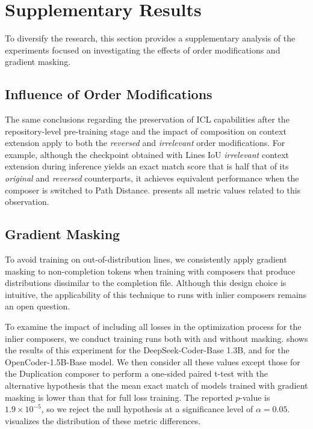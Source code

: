 \section{Supplementary Results}

To diversify the research, this section provides a supplementary analysis of the experiments focused on investigating the effects of order modifications and gradient masking.

\subsection{Influence of Order Modifications}

The same conclusions regarding the preservation of ICL capabilities after the repository-level pre-training stage and the impact of composition on context extension apply to both the \textit{reversed} and \textit{irrelevant} order modifications. For example, although the checkpoint obtained with Lines IoU \textit{irrelevant} context extension during inference yields an exact match score that is half that of its \textit{original} and \textit{reversed} counterparts, it achieves equivalent performance when the composer is switched to Path Distance.  presents all metric values related to this observation.

\subsection{Gradient Masking}\label{sec:gradient-masking}

To avoid training on out-of-distribution lines, we consistently apply gradient masking to non-completion tokens when training with composers that produce distributions dissimilar to the completion file. Although this design choice is intuitive, the applicability of this technique to runs with inlier composers remains an open question.

To examine the impact of including all losses in the optimization process for the inlier composers, we conduct training runs both with and without masking.  shows the results of this experiment for the DeepSeek-Coder-Base 1.3B, and  for the OpenCoder-1.5B-Base model. We then consider all these values except those for the Duplication composer to perform a one-sided paired t-test with the alternative hypothesis that the mean exact match of models trained with gradient masking is lower than that for full loss training. The reported \(p\)-value is \(1.9 \times 10^{-5}\), so we reject the null hypothesis at a significance level of \(\alpha = 0.05\).  visualizes the distribution of these metric differences.

